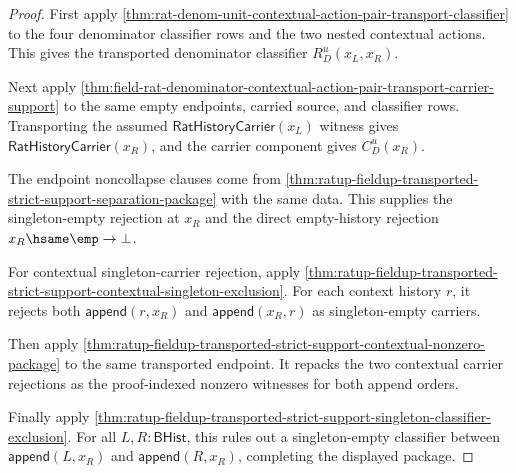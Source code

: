 \begin{proof}
First apply
\autoref{thm:rat-denom-unit-contextual-action-pair-transport-classifier} to the
four denominator classifier rows and the two nested contextual actions. This
gives the transported denominator classifier $R_D^u(x_L,x_R)$.

Next apply
\autoref{thm:field-rat-denominator-contextual-action-pair-transport-carrier-support}
to the same empty endpoints, carried source, and classifier rows. Transporting
the assumed $\mathsf{RatHistoryCarrier}(x_L)$ witness gives
$\mathsf{RatHistoryCarrier}(x_R)$, and the carrier component gives $C_D^u(x_R)$.

The endpoint noncollapse clauses come from
\autoref{thm:ratup-fieldup-transported-strict-support-separation-package} with
the same data. This supplies the singleton-empty rejection at $x_R$ and the
direct empty-history rejection $x_R\hsame\emp\to\bot$.

For contextual singleton-carrier rejection, apply
\autoref{thm:ratup-fieldup-transported-strict-support-contextual-singleton-exclusion}.
For each context history $r$, it rejects both
$\mathsf{append}(r,x_R)$ and $\mathsf{append}(x_R,r)$ as singleton-empty
carriers.

Then apply
\autoref{thm:ratup-fieldup-transported-strict-support-contextual-nonzero-package}
to the same transported endpoint. It repacks the two contextual carrier
rejections as the proof-indexed nonzero witnesses for both append orders.

Finally apply
\autoref{thm:ratup-fieldup-transported-strict-support-singleton-classifier-exclusion}.
For all $L,R:\mathsf{BHist}$, this rules out a singleton-empty classifier
between $\mathsf{append}(L,x_R)$ and $\mathsf{append}(R,x_R)$, completing the
displayed package.
\end{proof}

